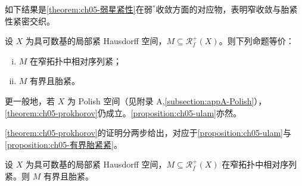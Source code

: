 \documentclass[../../main.tex]{subfiles}%
\begin{document}
如下结果是\cref{theorem:ch05-弱星紧性}在弱$^*$收敛方面的对应物，表明窄收敛与胎紧性紧密交织。

\begin{theorem}[Prokhorov]\label{theorem:ch05-prokhorov}\label{lemma:ch05-Prokhorov}
设 $X$ 为具可数基的局部紧 Hausdorff 空间，$M\subseteq\mathscr{R}^+_f(X)$。则下列命题等价：
\begin{enumerate}[(i)]
\item\label{item:ch05-prokth-i} $M$ 在窄拓扑中相对序列紧；
\item\label{item:ch05-prokth-ii} $M$ 有界且胎紧。
\end{enumerate}
\end{theorem}

\begin{remark}\label{remark:ch05-polish}
更一般地，若 $X$ 为 Polish 空间（见附录 A,\cref{subsection:appA-Polish}），\cref{theorem:ch05-prokhorov}仍成立。\cref{proposition:ch05-ulam}亦然。
\end{remark}

\cref{theorem:ch05-prokhorov}的证明分两步给出，对应于\cref{proposition:ch05-ulam}与\cref{proposition:ch05-有界胎紧紧}。

\begin{proposition}[Ulam]\label{proposition:ch05-ulam}
设 $X$ 为具可数基的局部紧 Hausdorff 空间，$M\subseteq\mathscr{R}^+_f(X)$ 在窄拓扑中相对序列紧。则 $M$ 有界且胎紧。
\end{proposition}
\end{document}
